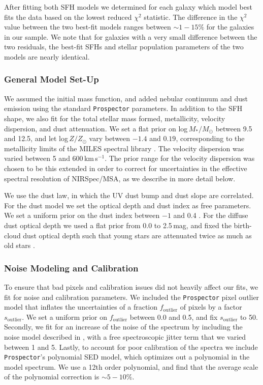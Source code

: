 \documentclass[twocolumn, astrosymb]{aastex631}
\begin{document}
After fitting both SFH models we determined for each galaxy which model best fits the data based on the lowest reduced $\chi^2$ statistic. The difference in the $\chi^2$ value between the two best-fit models ranges between $\sim1-15\%$ for the galaxies in our sample. We note that for galaxies with a very small difference between the two residuals, the best-fit SFHs and stellar population parameters of the two models are nearly identical.

\subsubsection{General Model Set-Up}
We assumed the \citet{GChabrier2003} initial mass function, and added nebular continuum and dust emission using the standard \texttt{Prospector} parameters. In addition to the SFH shape, we also fit for the total stellar mass formed, metallicity, velocity dispersion, and dust attenuation. We set a flat prior on log\,$M_{*}/M_{\odot}$ between 9.5 and 12.5, and let log\,$Z / Z_{\odot}$ vary between $-1.4$ and $0.19$, corresponding to the metallicity limits of the MILES spectral library \citep{JFalcon2011}. The velocity dispersion was varied between 5 and 600\,km\,s$^{-1}$. The prior range for the velocity dispersion was chosen to be this extended in order to correct for uncertainties in the effective spectral resolution of NIRSpec/MSA, as we describe in more detail below. 

We use the \citet{MKriek2013} dust law, in which the UV dust bump and dust slope are correlated. For the dust model we set the optical depth and dust index as free parameters. We set a uniform prior on the dust index between $-1$ and 0.4 \citep{SNoll2009}. For the diffuse dust optical depth we used a flat prior from 0.0 to 2.5\,mag, and fixed the birth-cloud dust optical depth such that young stars are attenuated twice as much as old stars \citep{VWild2020}. 

\subsubsection{Noise Modeling and Calibration}
To ensure that bad pixels and calibration issues did not heavily affect our fits, we fit for noise and calibration parameters. We included the \texttt{Prospector} pixel outlier model that inflates the uncertainties of a fraction $f_{\text{outlier}}$ of pixels by a factor $s_{\text{outlier}}$. We set a uniform prior on $f_{\text{outlier}}$ between 0.0 and 0.5, and fix $s_{\text{outlier}}$ to 50. Secondly, we fit for an increase of the noise of the spectrum by including the noise model described in \citet{BJohnson2021}, with a free spectroscopic jitter term that we varied between 1 and 5. Lastly, to account for poor calibration of the spectra we include \texttt{Prospector}'s polynomial SED model, which optimizes out a polynomial in the model spectrum. We use a 12th order polynomial, and find that the average scale of the polynomial correction is $\sim5-10\%$.
\end{document}
